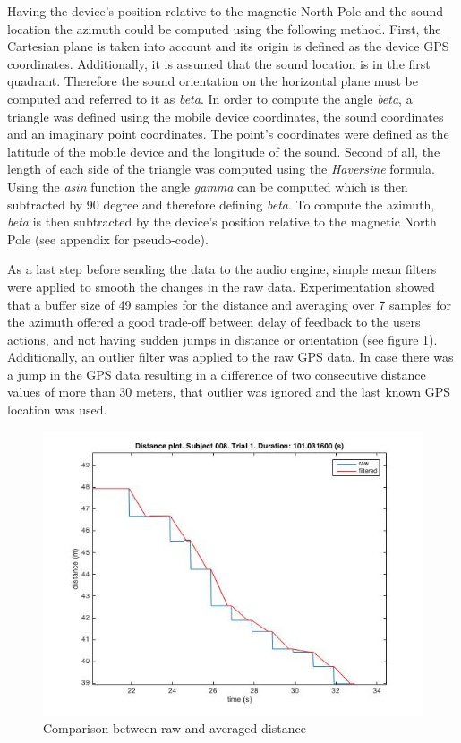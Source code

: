 \documentclass[journal]{IEEEtran}
\begin{document}
Having the device's position relative to the magnetic North Pole and the sound location the azimuth could be computed using the following method. First, the Cartesian plane is taken into account and its origin is defined as the device GPS coordinates. Additionally, it is assumed that the sound location is in the first quadrant. Therefore the sound orientation on the horizontal plane must be computed and referred to it as \textit{beta}. In order to compute the angle \textit{beta}, a triangle was defined using the mobile device coordinates, the sound coordinates and an imaginary point coordinates. The point's coordinates were defined as the latitude of the mobile device and the longitude of the sound. Second of all, the length of each side of the triangle was computed using the \textit{Haversine} formula. Using the \textit{asin} function the angle \textit{gamma} can be computed which is then subtracted by 90 degree and therefore defining \textit{beta}. To compute the azimuth, \textit{beta} is then subtracted by the device's position relative to the magnetic North Pole (see appendix for pseudo-code). 

As a last step before sending the data to the audio engine, simple mean filters were applied to smooth the changes in the raw data. Experimentation showed that a buffer size of 49 samples for the distance and averaging over 7 samples for the azimuth offered a good trade-off between delay of feedback to the users actions, and not having sudden jumps in distance or orientation (see figure \ref{fig:rawvsfiltered}). Additionally, an outlier filter was applied to the raw GPS data. In case there was a jump in the GPS data resulting in a difference of two consecutive distance values of more than 30 meters, that outlier was ignored and the last known GPS location was used.

\begin{figure}[h!]
\centering 
\includegraphics[scale=0.5]{graphics/rawvsfiltered.jpg} 
\caption{Comparison between raw and averaged distance}
\label{fig:rawvsfiltered} 
\end{figure}
\end{document}
